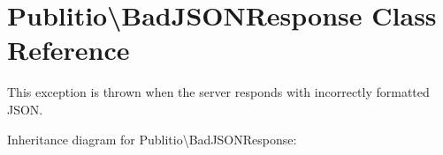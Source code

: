 \hypertarget{classPublitio_1_1BadJSONResponse}{}\section{Publitio\textbackslash{}Bad\+J\+S\+O\+N\+Response Class Reference}
\label{classPublitio_1_1BadJSONResponse}


This exception is thrown when the server responds with incorrectly formatted J\+S\+ON.  




Inheritance diagram for Publitio\textbackslash{}Bad\+J\+S\+O\+N\+Response\+:
